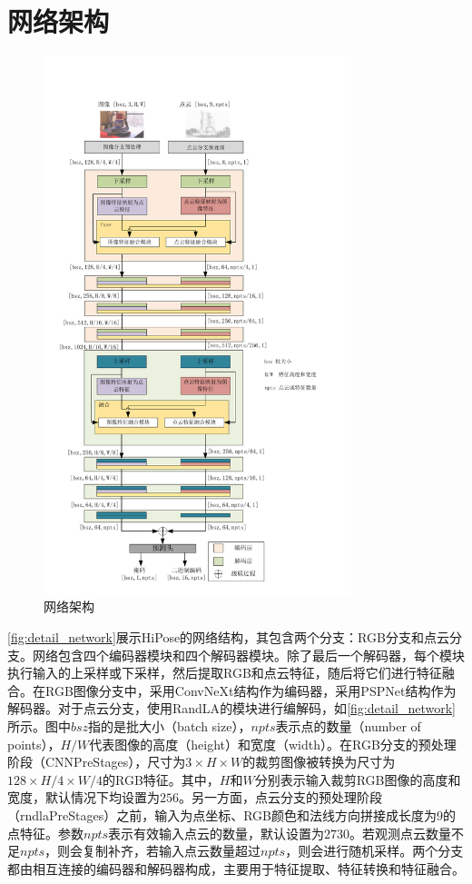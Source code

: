 \section{网络架构}

\begin{figure}[htbp]
    \centering
    \includegraphics[width=0.8\textwidth]{figure/hipose/network.pdf}
    \caption{网络架构}
    \label{fig:detail_network}
\end{figure}

\autoref{fig:detail_network}展示HiPose的网络结构，其包含两个分支：RGB分支和点云分支。网络包含四个编码器模块和四个解码器模块。除了最后一个解码器，每个模块执行输入的上采样或下采样，然后提取RGB和点云特征，随后将它们进行特征融合。在RGB图像分支中，采用ConvNeXt\cite{Liu2022ACF}结构作为编码器，采用PSPNet结构\cite{zhao2017pyramid}作为解码器。对于点云分支，使用RandLA\cite{hu2020randla}的模块进行编解码，如\autoref{fig:detail_network}所示。图中$bsz$指的是批大小（batch size），$npts$表示点的数量（number of points），$H/W$代表图像的高度（height）和宽度（width）。在RGB分支的预处理阶段（CNNPreStages），尺寸为$3 \times H \times W$的裁剪图像被转换为尺寸为$128 \times H/4 \times W/4$的RGB特征。其中，$H$和$W$分别表示输入裁剪RGB图像的高度和宽度，默认情况下均设置为$256$。另一方面，点云分支的预处理阶段（rndlaPreStages）之前，输入为点坐标、RGB颜色和法线方向拼接成长度为$9$的点特征。参数$npts$表示有效输入点云的数量，默认设置为$2730$。若观测点云数量不足$npts$，则会复制补齐，若输入点云数量超过$npts$，则会进行随机采样。两个分支都由相互连接的编码器和解码器构成，主要用于特征提取、特征转换和特征融合。

